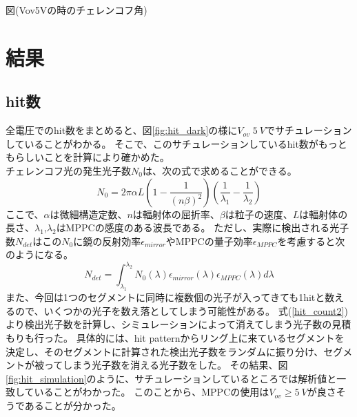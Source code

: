 \documentclass[uplatex, titlepage, dvipdfmx, 12pt, a4paper]{jsreport}
\begin{document}
      図(Vov5Vの時のチェレンコフ角)\\

\chapter{結果}
  \section{hit数}
    全電圧でのhit数をまとめると、図\ref{fig:hit_dark}の様に$V_{ov} \;\SI{5}{V}$でサチュレーションしていることがわかる。
    そこで、このサチュレーションしているhit数がもっともらしいことを計算により確かめた。\\
    チェレンコフ光の発生光子数$N_{0}$は、次の式で求めることができる。
    \begin{equation}
        N_{0} = 2 \pi \alpha L  \left(1 - \frac{1}{(n\beta)^2}\right) \left(\frac{1}{\lambda_{1}} - \frac{1}{\lambda_{2}}\right)
        \label{hit_count1}
    \end{equation}
    ここで、$\alpha$は微細構造定数、$n$は輻射体の屈折率、$\beta$は粒子の速度、$L$は輻射体の長さ、$\lambda_{1}$,$\lambda_{2}$はMPPCの感度のある波長である。
    ただし、実際に検出される光子数$N_{det}$はこの$N_{0}$に鏡の反射効率$\epsilon_{mirror}$やMPPCの量子効率$\epsilon_{MPPC}$を考慮すると次のようになる。
    \begin{equation}
        N_{det} = \int^{\lambda_2}_{\lambda_1} N_{0}\left(\lambda\right) \epsilon_{mirror}\left(\lambda\right) \epsilon_{MPPC}\left(\lambda\right) d\lambda
        \label{hit_count2}
    \end{equation}
    また、今回は1つのセグメントに同時に複数個の光子が入ってきても1hitと数えるので、いくつかの光子を数え落としてしまう可能性がある。
    式(\ref{hit_count2})より検出光子数を計算し、シミュレーションによって消えてしまう光子数の見積もりも行った。
    具体的には、hit patternからリング上に来ているセグメントを決定し、そのセグメントに計算された検出光子数をランダムに振り分け、セグメントが被ってしまう光子数を消える光子数をした。
    その結果、図\ref{fig:hit_simulation}のように、サチュレーションしているところでは解析値と一致していることがわかった。
    このことから、MPPCの使用は$V_{ov} \ge \SI{5}{V}$が良さそうであることが分かった。
\end{document}

